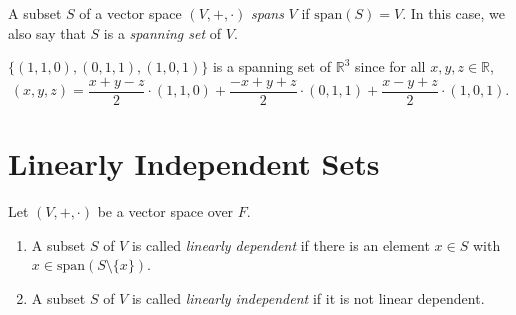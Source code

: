 \begin{definition}\label{def:spanning-set}
  A subset $S$ of a vector space $(V, +, \cdot)$ \emph{spans} $V$
  if $\mathrm{span}(S) = V$.
  In this case, we also say that $S$ is a \emph{spanning set} of $V$.
\end{definition}

\begin{example}
  $\{(1, 1, 0), (0, 1, 1), (1, 0, 1)\}$ is a spanning set of $\mathbb{R}^3$
  since for all $x, y, z \in \mathbb{R}$,
  \begin{equation*}
    (x, y, z)
      = \frac{x+y-z}{2} \cdot (1, 1, 0)
      + \frac{-x+y+z}{2} \cdot (0, 1, 1)
      + \frac{x-y+z}{2} \cdot (1, 0, 1).
  \end{equation*}
\end{example}

\section{Linearly Independent Sets}
\begin{definition}\label{def:linear-dependence}
  Let $(V, +, \cdot)$ be a vector space over $F$.
  \begin{enumerate}
    \item A subset $S$ of $V$ is called \emph{linearly dependent} if there is
      an element $x \in S$ with $x \in \mathrm{span}(S \setminus \{x\})$.
    \item A subset $S$ of $V$ is called \emph{linearly independent} if
      it is not linear dependent.
  \end{enumerate}
\end{definition}

